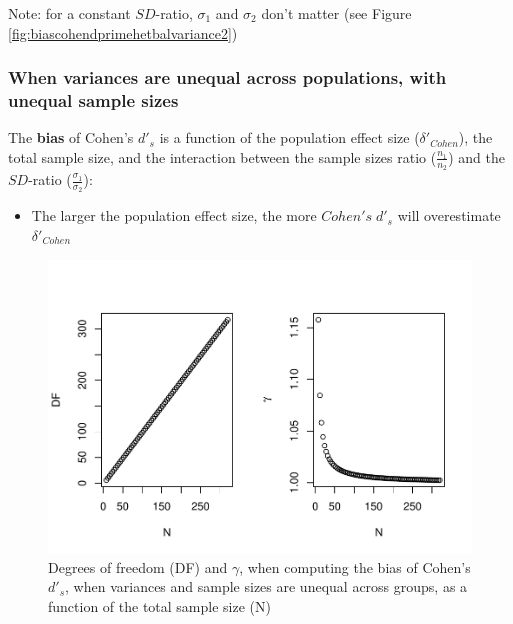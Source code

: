 \documentclass[
  man]{apa6}
\providecommand{\tightlist}{%
  \setlength{\itemsep}{0pt}\setlength{\parskip}{0pt}}
\begin{document}
Note: for a constant \(SD\)-ratio, \(\sigma_1\) and \(\sigma_2\) don't matter (see Figure \ref{fig:biascohendprimehetbalvariance2})

\hypertarget{when-variances-are-unequal-across-populations-with-unequal-sample-sizes}{%
\subsubsection{When variances are unequal across populations, with unequal sample sizes}\label{when-variances-are-unequal-across-populations-with-unequal-sample-sizes}}

The \textbf{bias} of Cohen's \(d'_s\) is a function of the population effect size (\(\delta'_{Cohen}\)), the total sample size, and the interaction between the sample sizes ratio (\(\frac{n_1}{n_2}\)) and the \(SD\)-ratio (\(\frac{\sigma_1}{\sigma_2}\)):

\begin{itemize}
\tightlist
\item
  The larger the population effect size, the more \(Cohen's \; d'_s\) will overestimate \(\delta'_{Cohen}\)
\end{itemize}

\begin{figure}
\centering
\includegraphics{Theoretical-Bias-of-all-estimators-as-a-function-of-population-parameters_files/figure-latex/biascohendprimehetunbalNsize2-1.pdf}
\caption{\label{fig:biascohendprimehetunbalNsize2}Degrees of freedom (DF) and \(\gamma\), when computing the bias of Cohen's \(d'_s\), when variances and sample sizes are unequal across groups, as a function of the total sample size (N)}
\end{figure}
\end{document}
